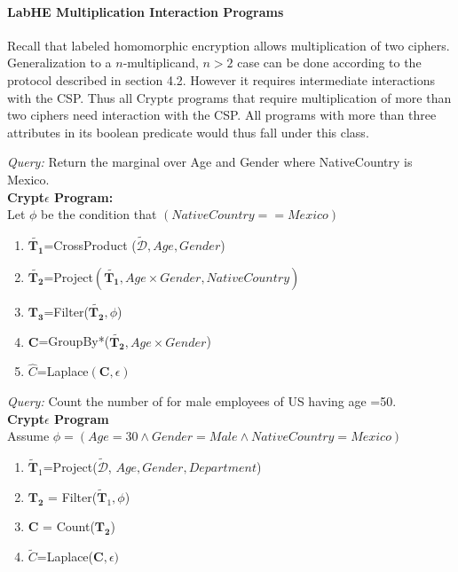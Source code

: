 \paragraph{\textbf{LabHE Multiplication Interaction Programs}}
Recall that labeled homomorphic encryption allows multiplication of two ciphers. Generalization to a $n$-multiplicand, $n > 2$ case can be done according to the protocol described in section 4.2. However it requires intermediate interactions with the \textsf{CSP}. Thus all Crypt$\epsilon$ programs that require multiplication of more than two ciphers need interaction with the \textsf{CSP}. 
All programs with more than three attributes in its boolean predicate would thus fall under this class.
\begin{exmp}\textit{Query:} Return the marginal over Age and Gender where NativeCountry is Mexico. \\\textbf{Crypt$\epsilon$ Program:}\\ Let $\phi$ be the condition that $(NativeCountry==Mexico) $ \end{exmp} \begin{enumerate}\item $\tilde{\mathbf{T_1}}$=\textsf{CrossProduct} ($\boldsymbol{\tilde{\mathcal{D}}},Age,Gender$) \item $\tilde{\mathbf{T_2}}$=\textsf{Project}$(\tilde{\mathbf{T_1}}, Age \times Gender, NativeCountry)$ \item $\mathbf{T_3}$=\textsf{Filter}($\tilde{\mathbf{T_2}},\phi$)\item $\mathbf{C}$=\textsf{GroupBy*}($\tilde{\mathbf{T_2}},Age\times Gender$)\item $\hat{C}$=\textsf{Laplace}$(\mathbf{C},\epsilon)$ \end{enumerate}
\begin{exmp} \textit{Query:} Count the number of for male employees of US having age =50. \\\textbf{Crypt$\epsilon$ Program} \\Assume $\phi=(Age=30 \wedge Gender=Male \wedge NativeCountry=Mexico)$ \end{exmp} \begin{enumerate} \item $\mathbf{\tilde{T}}_1$=\textsf{Project}($\boldsymbol{\tilde{\mathcal{D}}}$, $Age,Gender,Department$)  \item  $\mathbf{T_2}$ = \textsf{Filter}($\mathbf{\tilde{T}}_1,\phi$)\item $\mathbf{C}$ = \textsf{Count}($\mathbf{T_2}$) \item $\tilde{C}$=\textsf{Laplace}($\mathbf{C},\epsilon)$\end{enumerate}
